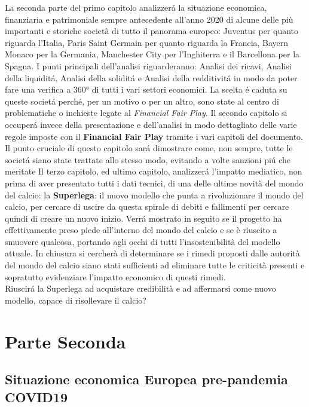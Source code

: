 \documentclass[
    corpo=12pt,
    oneside,
    evenboxes,
    tipotesi=triennale,
    stile=classica,
    oldstyle,
    autoretitolo,
    greek,
]{toptesi}
\begin{document}
\begin{interlinea}{1.5}
La seconda parte del primo capitolo analizzer\'a la situazione economica, finanziaria e patrimoniale sempre antecedente all'anno 2020 di alcune delle più 
importanti e storiche societ\`a di tutto il panorama europeo: Juventus per quanto riguarda l'Italia, Paris Saint Germain per quanto riguarda la 
Francia, Bayern Monaco per la Germania, Manchester City per l'Inghiterra e il Barcellona per la Spagna. I punti principali dell'analisi riguarderanno: 
Analisi dei ricavi, Analisi della liquidit\'a, Analisi della solidit\'a e Analisi della redditivit\'a in modo da 
poter fare una verifica a 360° di tutti i vari settori economici. La scelta \'e caduta su queste societ\'a perch\'e, per un motivo o per un altro, sono state 
al centro di problematiche o inchieste legate al \emph{Financial Fair Play}.\newline
Il secondo capitolo si occuper\'a invece della presentazione e dell'analisi in modo dettagliato delle varie regole imposte con il
\textbf{Financial Fair Play} tramite i vari capitoli del documento. Il punto cruciale di questo capitolo sar\'a dimostrare come, non sempre, 
tutte le societ\'a siano state trattate allo stesso modo, evitando a volte sanzioni pi\'u che meritate\newline
Il terzo capitolo, ed ultimo capitolo, analizzer\'a l'impatto mediatico, non prima di aver presentato tutti i dati tecnici, di una delle ultime novità 
del mondo del calcio: la \textbf{Superlega}: il nuovo modello che punta a rivoluzionare il mondo del calcio, per cercare di uscire da questa spirale di debiti
e fallimenti per cercare quindi di creare un nuovo inizio. Verr\'a mostrato in seguito se il progetto ha effettivamente preso piede all'interno del mondo del calcio 
e se è riuscito a smuovere qualcosa, portando agli occhi di tutti l'insostenibilità del modello attuale.\newline
In chiusura si cercherà di determinare se i rimedi proposti dalle autorità del mondo del calcio siano stati sufficienti ad eliminare tutte le criticità presenti e 
sopratutto evidenziare l'impatto economico di questi rimedi.\\
Riuscir\'a la Superlega ad acquistare credibilità e ad affermarsi come nuovo modello, capace di risollevare il calcio?

\part{Parte Seconda}
\chapter{Situazione economica Europea pre-pandemia COVID19}

\end{interlinea}
\end{document}
